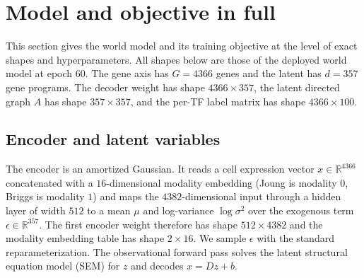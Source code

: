 
\section{Model and objective in full}\label{app:model_full}
This section gives the world model and its training objective at the level of exact
shapes and hyperparameters. All shapes below are those of the deployed world model at
epoch $60$. The gene axis has $G{=}4366$ genes and the latent has $d{=}357$ gene
programs. The decoder weight has shape $4366\times357$, the latent directed graph $A$ has
shape $357\times357$, and the per-TF label matrix has shape $4366\times100$.

\subsection{Encoder and latent variables}
The encoder is an amortized Gaussian. It reads a cell expression vector
$x\in\mathbb{R}^{4366}$ concatenated with a $16$-dimensional modality embedding
(Joung is modality $0$, Briggs is modality $1$) and maps the $4382$-dimensional input
through a hidden layer of width $512$ to a mean $\mu$ and log-variance
$\log\sigma^2$ over the exogenous term $\epsilon\in\mathbb{R}^{357}$. The first encoder
weight therefore has shape $512\times4382$ and the modality embedding table has shape
$2\times16$. We sample $\epsilon$ with the standard reparameterization. The
observational forward pass solves the latent structural equation model (SEM) for $z$
and decodes $x{=}Dz{+}b$.

